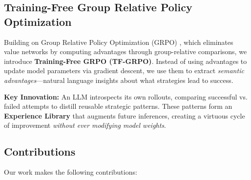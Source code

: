 \documentclass[11pt,a4paper]{article}
\begin{document}
\subsection{Training-Free Group Relative Policy Optimization}

Building on Group Relative Policy Optimization (GRPO) \cite{shao2024deepseekmath}, which eliminates value networks by computing advantages through group-relative comparisons, we introduce \textbf{Training-Free GRPO (TF-GRPO)}. Instead of using advantages to update model parameters via gradient descent, we use them to extract \textit{semantic advantages}—natural language insights about what strategies lead to success.

\textbf{Key Innovation:} An LLM introspects its own rollouts, comparing successful vs. failed attempts to distill reusable strategic patterns. These patterns form an \textbf{Experience Library} that augments future inferences, creating a virtuous cycle of improvement \textit{without ever modifying model weights}.

\subsection{Contributions}

Our work makes the following contributions:
\end{document}
